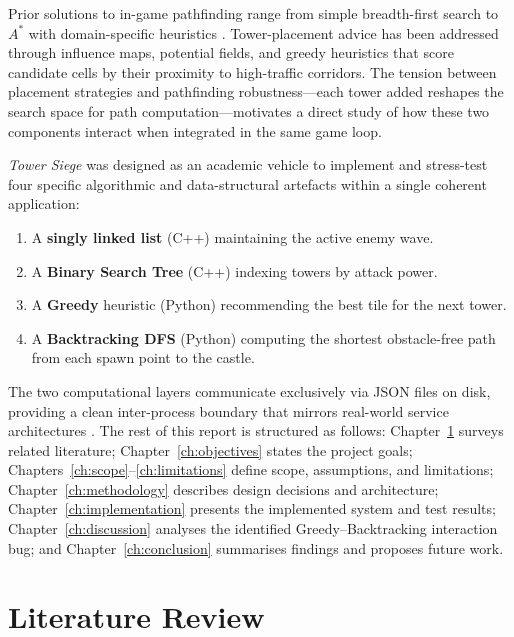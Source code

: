 \documentclass[12pt,a4paper]{report}
\begin{document}
Prior solutions to in-game pathfinding range from simple breadth-first search
to $A^*$ with domain-specific heuristics \cite{hart1968astar}.
Tower-placement advice has been addressed through influence maps, potential
fields, and greedy heuristics that score candidate cells by their proximity
to high-traffic corridors.
The tension between placement strategies and pathfinding robustness---each tower
added reshapes the search space for path computation---motivates a direct study
of how these two components interact when integrated in the same game loop.

\textit{Tower Siege} was designed as an academic vehicle to implement and stress-test
four specific algorithmic and data-structural artefacts within a single coherent
application:

\begin{enumerate}
  \item A \textbf{singly linked list} (C++) maintaining the active enemy wave.
  \item A \textbf{Binary Search Tree} (C++) indexing towers by attack power.
  \item A \textbf{Greedy} heuristic (Python) recommending the best tile for the
        next tower.
  \item A \textbf{Backtracking DFS} (Python) computing the shortest obstacle-free
        path from each spawn point to the castle.
\end{enumerate}

The two computational layers communicate exclusively via JSON files on disk,
providing a clean inter-process boundary that mirrors real-world service
architectures \cite{python3json}.
The rest of this report is structured as follows: Chapter~\ref{ch:litreview}
surveys related literature; Chapter~\ref{ch:objectives} states the project goals;
Chapters~\ref{ch:scope}--\ref{ch:limitations} define scope, assumptions, and
limitations; Chapter~\ref{ch:methodology} describes design decisions and
architecture; Chapter~\ref{ch:implementation} presents the implemented system
and test results; Chapter~\ref{ch:discussion} analyses the identified
Greedy–Backtracking interaction bug; and Chapter~\ref{ch:conclusion} summarises
findings and proposes future work.

\chapter{Literature Review}
\label{ch:litreview}
\end{document}
